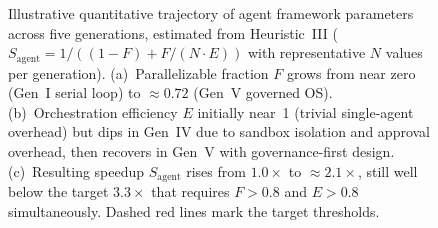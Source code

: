\begin{figure}[htbp]
{}%
\caption{Illustrative quantitative trajectory of agent framework parameters across five generations, estimated from Heuristic~III ($S_{\mathrm{agent}} = 1/((1-F)+F/(N{\cdot}E))$ with representative $N$ values per generation). (a)~Parallelizable fraction $F$ grows from near zero (Gen~I serial loop) to ${\approx}0.72$ (Gen~V governed OS). (b)~Orchestration efficiency $E$ initially near~1 (trivial single-agent overhead) but dips in Gen~IV due to sandbox isolation and approval overhead, then recovers in Gen~V with governance-first design. (c)~Resulting speedup $S_{\mathrm{agent}}$ rises from $1.0\times$ to ${\approx}2.1\times$, still well below the target $3.3\times$ that requires $F>0.8$ and $E>0.8$ simultaneously. Dashed red lines mark the target thresholds.}
\label{fig:gen_trajectory}
\end{figure}
